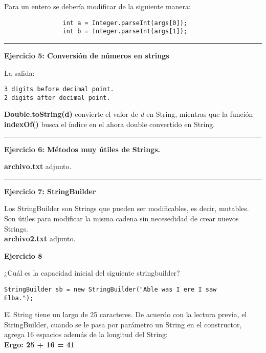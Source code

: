 \documentclass[12pt,letterpaper, onecolumn]{exam}
\begin{document}
\begin{questions}
\begin{solution}
      Para un entero se debería modificar de la siguiente manera:
      \begin{verbatim}
                int a = Integer.parseInt(args[0]);
                int b = Integer.parseInt(args[1]);
      \end{verbatim}
         \end{solution}


\noindent\rule{8cm}{0.4pt}
\question[] \textbf{Ejercicio 5: Conversión de números en strings}\droppoints

\begin{solution}
  La salida:
  \begin{verbatim}
3 digits before decimal point.
2 digits after decimal point.
  \end{verbatim}

  \textbf{Double.toString(d)} convierte el valor de \textit{d} en String, mientras que la función \textbf{indexOf()} busca el índice en el ahora double convertido en String.
\end{solution}


\noindent\rule{8cm}{0.4pt}
\newpage
\question[] \textbf{Ejercicio 6: Métodos muy útiles de Strings.}\droppoints

\begin{solution}
  \textbf{archivo.txt} adjunto.
\end{solution}

\noindent\rule{8cm}{0.4pt}

\question[] \textbf{Ejercicio 7: StringBuilder}\droppoints
\begin{solution}
Los StringBuilder son Strings que pueden ser modificables, es decir, mutables. Son útiles para modificar la misma cadena sin necesedidad de crear nuevos Strings. \\
  \textbf{archivo2.txt} adjunto.
\end{solution}


\question[] \textbf{Ejercicio 8}\droppoints

¿Cuál es la capacidad inicial del siguiente stringbuilder?
\begin{verbatim}
StringBuilder sb = new StringBuilder("Able was I ere I saw
Elba.");
\end{verbatim}

\begin{solution}
  El String tiene un largo de 25 caracteres. De acuerdo con la lectura previa, el StringBuilder, cuando se le pasa por parámetro un String en el constructor, agrega 16 espacios además de la longitud del String: \\
  \textbf{Ergo: 25 + 16 = 41}
\end{solution}



\end{questions}
\end{document}
